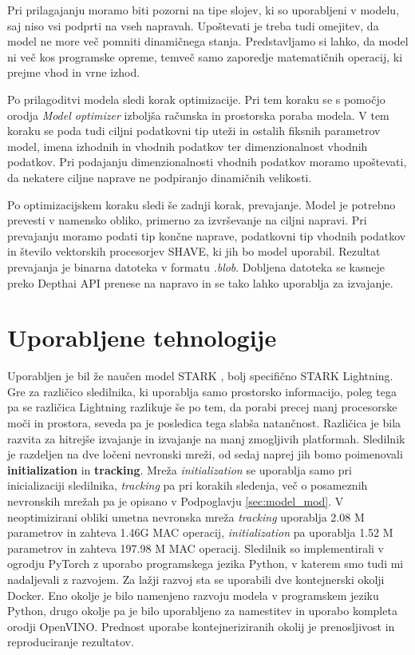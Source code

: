 \documentclass[a4paper,12pt,openright]{book}
\begin{document}
Pri prilagajanju moramo biti pozorni na tipe slojev, ki so uporabljeni v modelu, saj niso vsi podprti na vseh napravah. Upoštevati je treba tudi omejitev, da model ne more več pomniti dinamičnega stanja. Predstavljamo si lahko, da model ni več kos programske opreme, temveč samo zaporedje matematičnih operacij, ki prejme vhod in vrne izhod.

Po prilagoditvi modela sledi korak optimizacije. Pri tem koraku se s pomočjo orodja \emph{Model optimizer} izboljša računska in prostorska poraba modela. V tem koraku se poda tudi ciljni podatkovni tip uteži in ostalih fiksnih parametrov model, imena izhodnih in vhodnih podatkov ter dimenzionalnost vhodnih podatkov. Pri podajanju dimenzionalnosti vhodnih podatkov moramo upoštevati, da nekatere ciljne naprave ne podpiranjo dinamičnih velikosti.

Po optimizacijskem koraku sledi še zadnji korak, prevajanje. Model je potrebno prevesti v namensko obliko, primerno za izvrševanje na ciljni napravi. Pri prevajanju moramo podati tip končne naprave, podatkovni tip vhodnih podatkov in število vektorskih procesorjev SHAVE, ki jih bo model uporabil. Rezultat prevajanja je binarna datoteka v formatu \emph{.blob}. Dobljena datoteka se kasneje preko Depthai API prenese na napravo in se tako lahko uporablja za izvajanje.

\section{Uporabljene tehnologije}
Uporabljen je bil že naučen model STARK \cite{stark}, bolj specifično STARK Lightning. Gre za različico sledilnika, ki uporablja samo prostorsko informacijo, poleg tega pa se različica Lightning razlikuje še po tem, da porabi precej manj procesorske moči in prostora, seveda pa je posledica tega slabša natančnost. Različica je bila razvita za hitrejše izvajanje in izvajanje na manj zmogljivih platformah. Sledilnik je razdeljen na dve ločeni nevronski mreži, od sedaj naprej jih bomo poimenovali \textbf{initialization} in \textbf{tracking}. Mreža \emph{initialization} se uporablja samo pri inicializaciji sledilnika, \emph{tracking} pa pri korakih sledenja, več o posameznih nevronskih mrežah pa je opisano v Podpoglavju \ref{sec:model_mod}. V neoptimizirani obliki umetna nevronska mreža \emph{tracking} uporablja 2.08 M parametrov in zahteva 1.46G MAC operacij, \emph{initialization} pa uporablja 1.52 M parametrov in zahteva 197.98 M MAC operacij. Sledilnik so \cite{stark} implementirali v ogrodju PyTorch z uporabo programskega jezika Python, v katerem smo tudi mi nadaljevali z razvojem. Za lažji razvoj sta se uporabili dve kontejnerski okolji Docker. Eno okolje je bilo namenjeno razvoju modela v programskem jeziku Python, drugo okolje pa je bilo uporabljeno za namestitev in uporabo kompleta orodji OpenVINO. Prednost uporabe kontejneriziranih okolij je prenosljivost in reproduciranje rezultatov.
\end{document}
